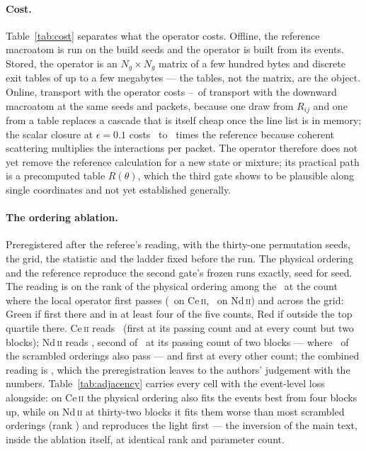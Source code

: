 \documentclass[aps,prl,twocolumn,superscriptaddress,nofootinbib,longbibliography]{revtex4-2}
\begin{document}
\paragraph{Cost.} Table~\ref{tab:cost} separates what the operator costs.
Offline, the reference macroatom is run on the build seeds and the
operator is built from its events. Stored, the operator is an
$N_g\times N_g$ matrix of a few hundred bytes and discrete exit tables of
up to a few megabytes --- the tables, not the matrix, are the object.
Online, transport with the operator costs \PBOpOverRefMin--\PBOpOverRefMax\
of transport with the downward macroatom at the same seeds and packets,
because one draw from $R_{ij}$ and one from a table replaces a cascade
that is itself cheap once the line list is in memory; the scalar closure
at $\epsilon=0.1$ costs \PBNdScalarOverRef\ to
\PBBlendScalarOverRef\ times the reference because coherent scattering
multiplies the interactions per packet. The operator therefore does not
yet remove the reference calculation for a new state or mixture; its
practical path is a precomputed table $R(\theta)$, which the third gate
shows to be plausible along single coordinates and not yet established
generally.

\paragraph{The ordering ablation.} Preregistered after the referee's
reading, with the thirty-one permutation seeds, the grid, the statistic
and the ladder fixed before the run. The physical ordering and the
reference reproduce the second gate's frozen runs exactly, seed for seed.
The reading is on the rank of the physical ordering among the
\PBNOrderings\ at the count where the local operator first passes
(\PBCeKlocal\ on Ce\,\textsc{ii}, \PBNdKlocal\ on Nd\,\textsc{ii}) and
across the grid: Green if first there and in at least four of the five
counts, Red if outside the top quartile there. Ce\,\textsc{ii} reads
\PBCeGtwoR\ (first at its passing count and at every count but two
blocks); Nd\,\textsc{ii} reads \PBNdGtwoR, second of \PBNOrderings\ at
its passing count of two blocks --- where \PBNdAdjScrPass\ of the
scrambled orderings also pass --- and first at every other count; the
combined reading is \PBGtwoR, which the preregistration leaves to the
authors' judgement with the numbers. Table~\ref{tab:adjacency} carries
every cell with the event-level loss alongside: on Ce\,\textsc{ii} the
physical ordering also fits the events best from four blocks up, while on
Nd\,\textsc{ii} at thirty-two blocks it fits them worse than most
scrambled orderings (rank \PBNdAdjEvRankThirtyTwo) and reproduces the light
first --- the inversion of the main text, inside the ablation
itself, at identical rank and parameter count.
\end{document}
